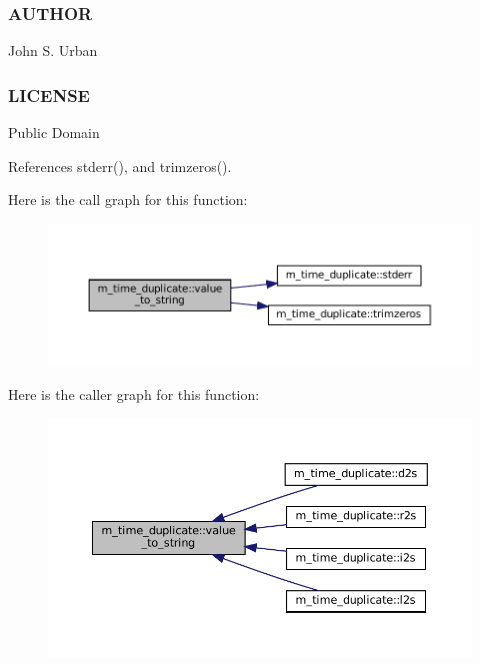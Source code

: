 \subsubsection*{A\+U\+T\+H\+OR}

John S. Urban \subsubsection*{L\+I\+C\+E\+N\+SE}

Public Domain 

References stderr(), and trimzeros().

Here is the call graph for this function\+:\nopagebreak
\begin{figure}[H]
\begin{center}
\leavevmode
\includegraphics[width=350pt]{namespacem__time__duplicate_ab836a3b7c441e5b324639db734b7de9f_cgraph}
\end{center}
\end{figure}
Here is the caller graph for this function\+:\nopagebreak
\begin{figure}[H]
\begin{center}
\leavevmode
\includegraphics[width=350pt]{namespacem__time__duplicate_ab836a3b7c441e5b324639db734b7de9f_icgraph}
\end{center}
\end{figure}
